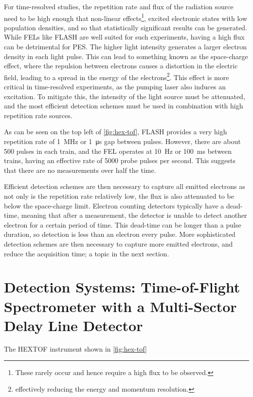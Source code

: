 For time-resolved studies, the repetition rate and flux of the radiation source need to be high enough that non-linear effects\footnote{These rarely occur and hence require a high flux to be observed.}, excited electronic states with low population densities, and so that statistically significant results can be generated. While \glspl{FEL} like \gls{FLASH} are well suited for such experiments, having a high flux can be detrimental for \gls{PES}. The higher light intensity generates a larger electron density in each light pulse. This can lead to something known as the space-charge effect, where the repulsion between electrons causes a distortion in the electric field, leading to a spread in the energy of the electrons\footnote{effectively reducing the energy and momentum resolution.}. This effect is more critical in time-resolved experiments, as the pumping laser also induces an excitation. To mitigate this, the intensity of the light source must be attenuated, and the most efficient detection schemes must be used in combination with high repetition rate sources.

As can be seen on the top left of \cref{fig:hex-tof}, \gls{FLASH} provides a very high repetition rate of \qty{1}{\mega\hertz} or \qty{1}{\micro\second} gap between \glspl{pulse}. However, there are about 500 pulses in each \gls{train}, and the \gls{FEL} operates at \qty{10}{\Hz} or \qty{100}{\milli\second} between trains, having an effective rate of \num{5000} probe pulses per second. This suggests that there are no measurements over half the time. 

Efficient detection schemes are then necessary to capture all emitted electrons as not only is the repetition rate relatively low, the flux is also attenuated to be below the space-charge limit. Electron counting detectors typically have a dead-time, meaning that after a measurement, the detector is unable to detect another electron for a certain period of time. This dead-time can be longer than a pulse duration, so detection is less than an electron every pulse. More sophisticated detection schemes are then necessary to capture more emitted electrons, and reduce the acquisition time; a topic in the next section.

\section{Detection Systems: Time-of-Flight Spectrometer with a Multi-Sector Delay Line Detector}
The \gls{HEXTOF} instrument shown in \cref{fig:hex-tof}

